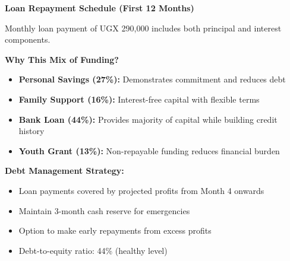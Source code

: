 \begin{center}
\textbf{Loan Repayment Schedule (First 12 Months)}
\vspace{0.5em}


\vspace{0.5em}
Monthly loan payment of UGX 290,000 includes both principal and interest components.
\end{center}

\vspace{1em}

\begin{tcolorbox}[mybox, title=\textbf{Financing Strategy Rationale}]
\textbf{Why This Mix of Funding?}
\begin{itemize}[leftmargin=1em, itemsep=0pt]
    \item \textbf{Personal Savings (27\%):} Demonstrates commitment and reduces debt
    \item \textbf{Family Support (16\%):} Interest-free capital with flexible terms
    \item \textbf{Bank Loan (44\%):} Provides majority of capital while building credit history
    \item \textbf{Youth Grant (13\%):} Non-repayable funding reduces financial burden
\end{itemize}

\textbf{Debt Management Strategy:}
\begin{itemize}[leftmargin=1em, itemsep=0pt]
    \item Loan payments covered by projected profits from Month 4 onwards
    \item Maintain 3-month cash reserve for emergencies
    \item Option to make early repayments from excess profits
    \item Debt-to-equity ratio: 44\% (healthy level)
\end{itemize}
\end{tcolorbox}

